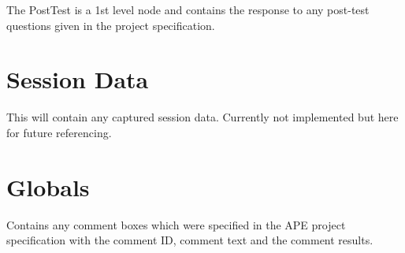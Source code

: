 \documentclass{article}
\begin{document}
The PostTest is a 1st level node and contains the response to any post-test questions given in the project specification.

\section{Session Data}
This will contain any captured session data. Currently not implemented but here for future referencing.

\section{Globals}
Contains any comment boxes which were specified in the APE project specification with the comment ID, comment text and the comment results.
\end{document}
